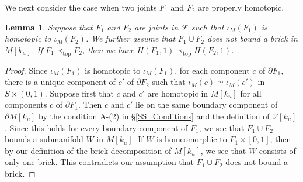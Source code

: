 \documentclass{amsart}
\newtheorem{lemma}[theorem]{Lemma}
\theoremstyle{definition}
\numberwithin{figure}{section}
\numberwithin{equation}{section}
\newcommand{\pretop}{\prec_\mathrm{top}}
\def\cv{\mathcal{V}}
\begin{document}
We next consider the case when two joints $F_1$ and $F_2$ are properly homotopic.

\begin{lemma}
\label{homotopic joints}
Suppose that $F_1$ and $F_2$ are joints in $\mathcal F$ such that $\iota_M(F_1)$ is homotopic to $\iota_M(F_2)$.
We further assume that  $F_1 \cup F_2$ does not bound a brick in $M[k_u]$.
If $F_1 \pretop  F_2$, then we have $H(F_1, 1) \pretop H(F_2, 1)$.
\end{lemma}
\begin{proof}
%
Since $\iota_M(F_1)$ is homotopic to $\iota_M(F_1)$, for each component $c$ of $\partial  F_1$, there is a unique component of $c'$  of $\partial  F_2$ such that $\iota_M(c)\simeq \iota_M(c')$ in $S \times (0,1)$.
Suppose first that $c$ and $c'$ are homotopic in $M[k_u]$ for all components $c$ of $\partial F_1$.
Then $c$ and $c'$ lie on the same boundary component of $\partial M[k_u]$ by the condition A-(2) in \S\ref{SS_Conditions} and the definition of $\cv[k_u]$.
Since this holds for every boundary component of $F_1$, we see that  $F_1 \cup F_2$ bounds a submanifold $W$ in $M[k_u]$.
If $W$ is homeomorphic to $F_1 \times [0,1]$, then by our definition of the brick decomposition of $M[k_u]$, we see that $W$ consists of only one brick.
This contradicts our assumption that $F_1 \cup F_2$ does not bound a brick.


\end{proof}
\end{document}
